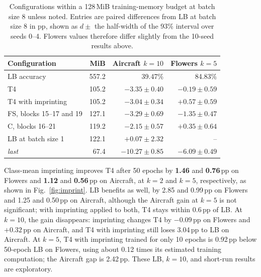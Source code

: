 \documentclass[sigconf,nonacm]{acmart}
\begin{document}
\begin{table}[!t]
  \caption{Configurations within a 128\,MiB training-memory budget at batch size 8 unless noted. Entries are paired differences from LB at batch size 8 in pp, shown as $d\pm$ the half-width of the 93\% interval over seeds 0--4. Flowers values therefore differ slightly from the 10-seed results above.}
  \label{tab:budget}
  \footnotesize
  \setlength{\tabcolsep}{4pt}
  \begin{tabular}{@{}lrrr@{}}
    \toprule
    Configuration & MiB & Aircraft $k=10$ & Flowers $k=5$ \\
    \midrule
    LB accuracy & 557.2 & 39.47\% & 84.83\% \\
    \midrule
    T4 & 105.2 & $-3.35\pm0.40$ & $-0.19\pm0.59$ \\
    T4 with imprinting & 105.2 & $-3.04\pm0.34$ & $+0.57\pm0.59$ \\
    FS, blocks 15--17 and 19 & 127.1 & $-3.29\pm0.69$ & $-1.35\pm0.47$ \\
    C, blocks 16--21 & 119.2 & $-2.15\pm0.57$ & $+0.35\pm0.64$ \\
    LB at batch size 1 & 122.1 & $+0.07\pm2.32$ & -- \\
    \emph{last} & 67.4 & $-10.27\pm0.85$ & $-6.09\pm0.49$ \\
    \bottomrule
  \end{tabular}
\end{table}

Class-mean imprinting improves T4 after 50 epochs by \textbf{1.46} and \textbf{0.76}\,pp on Flowers and \textbf{1.12} and \textbf{0.56}\,pp on Aircraft, at $k=2$ and $k=5$, respectively, as shown in Fig.~\ref{fig:imprint}. LB benefits as well, by 2.85 and 0.99\,pp on Flowers and 1.25 and 0.50\,pp on Aircraft, although the Aircraft gain at $k=5$ is not significant; with imprinting applied to both, T4 stays within 0.6\,pp of LB. At $k=10$, the gain disappears: imprinting changes T4 by $-0.09$\,pp on Flowers and $+0.32$\,pp on Aircraft, and T4 with imprinting still loses 3.04\,pp to LB on Aircraft. At $k=5$, T4 with imprinting trained for only 10 epochs is 0.92\,pp below 50-epoch LB on Flowers, using about 0.12 times its estimated training computation; the Aircraft gap is 2.42\,pp. These LB, $k=10$, and short-run results are exploratory.



\end{document}
